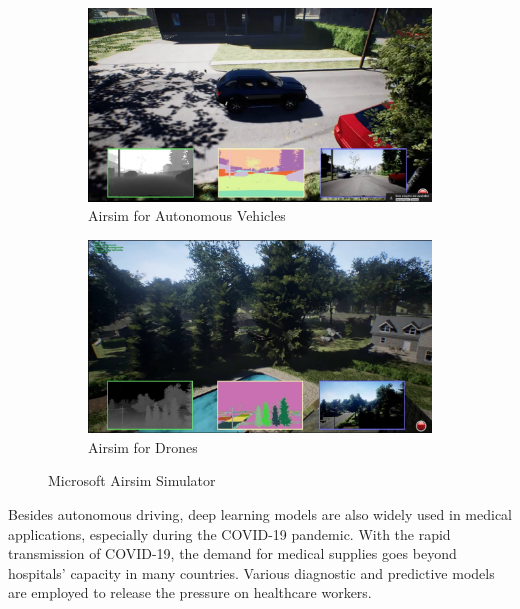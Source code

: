 \begin{figure}[H]
\centering
\begin{subfigure}[b]{0.48\textwidth}
    \centering
    \includegraphics[width=\textwidth]{figures/chapter_intro/airsim_car.jpg}
    \caption{Airsim for Autonomous Vehicles}
    \label{fig:airsim_car}
\end{subfigure}
\hfill
\begin{subfigure}[b]{0.48\textwidth}
    \centering
    \includegraphics[width=\textwidth]{figures/chapter_intro/airsim_drone.jpg}
    \caption{Airsim for Drones}
    \label{fig:airsim_drone}
\end{subfigure}
\hfill
\caption{Microsoft Airsim Simulator \citep{airsim2017fsr}}
\label{fig.airsim}
\end{figure}

Besides autonomous driving, deep learning models are also widely used in medical applications, especially during the COVID-19 pandemic. With the rapid transmission of COVID-19, the demand for medical supplies goes beyond hospitals' capacity in many countries. Various diagnostic and predictive models are employed to release the pressure on healthcare workers.

